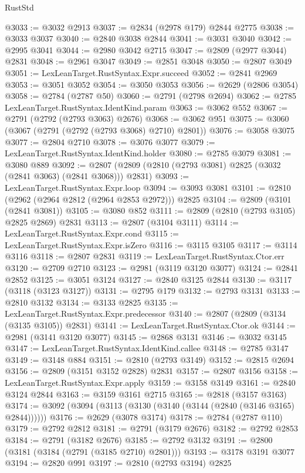 \begin{lexlean}{RustStd}
\begin{coremodule}
{\begin{coremodule}
{{{{{{{{{{{{{{{{{{{{{{{{{{{{{{{{{@3033 := @3032 @2913
@3037 := @2834 (@2978 @179) @2844 @2775
@3038 := @3033 @3037
@3040 := @2840 @3038 @2844
@3041 := @3031 @3040
@3042 := @2995 @3041
@3044 := @2980 @3042 @2715
@3047 := @2809 (@2977 @3044) @2831
@3048 := @2961 @3047
@3049 := @2851 @3048
@3050 := @2807 @3049
@3051 := LexLeanTarget.RustSyntax.Expr.succeed
@3052 := @2841 @2969
@3053 := @3051 @3052
@3054 := @3050 @3053
@3056 := @2629 (@2806 @3054)
@3058 := @2784 (@2787 @50)
@3060 := @2791 (@2798 @2694)
@3062 := @2785 LexLeanTarget.RustSyntax.IdentKind.param
@3063 := @3062 @552
@3067 := @2791 (@2792 (@2793 @3063) @2676)
@3068 := @3062 @951
@3075 := @3060 (@3067 (@2791 (@2792 (@2793 @3068) @2710) @2801))
@3076 := @3058 @3075
@3077 := @2804 @2710
@3078 := @3076 @3077
@3079 := LexLeanTarget.RustSyntax.IdentKind.holder
@3080 := @2785 @3079
@3081 := @3080 @889
@3092 := @2807 (@2809 (@2810 (@2793 @3081) @2825 (@3032 (@2841 @3063) (@2841 @3068))) @2831)
@3093 := LexLeanTarget.RustSyntax.Expr.loop
@3094 := @3093 @3081
@3101 := @2810 (@2962 (@2964 @2812 (@2964 @2853 @2972))) @2825
@3104 := @2809 (@3101 (@2841 @3081))
@3105 := @3080 @852
@3111 := @2809 (@2810 (@2793 @3105) @2825 @2869) @2831
@3113 := @2807 (@3104 @3111)
@3114 := LexLeanTarget.RustSyntax.Expr.cond
@3115 := LexLeanTarget.RustSyntax.Expr.isZero
@3116 := @3115 @3105
@3117 := @3114 @3116
@3118 := @2807 @2831
@3119 := LexLeanTarget.RustSyntax.Ctor.err
@3120 := @2709 @2710
@3123 := @2981 (@3119 @3120 @3077)
@3124 := @2841 @2852
@3125 := @3051 @3124
@3127 := @2840 @3125 @2844
@3130 := @3117 (@3118 (@3123 @3127))
@3131 := @2795 @179
@3132 := @2793 @3131
@3133 := @2810 @3132
@3134 := @3133 @2825
@3135 := LexLeanTarget.RustSyntax.Expr.predecessor
@3140 := @2807 (@2809 (@3134 (@3135 @3105)) @2831)
@3141 := LexLeanTarget.RustSyntax.Ctor.ok
@3144 := @2981 (@3141 @3120 @3077)
@3145 := @2868 @3131
@3146 := @3032 @3145
@3147 := LexLeanTarget.RustSyntax.IdentKind.callee
@3148 := @2785 @3147
@3149 := @3148 @884
@3151 := @2810 (@2793 @3149)
@3152 := @2815 @2694
@3156 := @2809 (@3151 @3152 @2828) @2831
@3157 := @2807 @3156
@3158 := LexLeanTarget.RustSyntax.Expr.apply
@3159 := @3158 @3149
@3161 := @2840 @3124 @2844
@3163 := @3159 @3161 @2715
@3165 := @2818 (@3157 @3163)
@3174 := @3092 (@3094 (@3113 (@3130 (@3140 (@3144 (@2840 (@3146 @3165) @2844))))))
@3176 := @2629 (@3078 @3174)
@3178 := @2784 (@2787 @110)
@3179 := @2792 @2812
@3181 := @2791 (@3179 @2676)
@3182 := @2792 @2853
@3184 := @2791 (@3182 @2676)
@3185 := @2792 @3132
@3191 := @2800 (@3181 (@3184 (@2791 (@3185 @2710) @2801)))
@3193 := @3178 @3191 @3077
@3194 := @2820 @991
@3197 := @2810 (@2793 @3194) @2825
}}}}}}}}}}}}}}}}}}}}}}}}}}}}}}}}}
\end{coremodule}}
\end{coremodule}
\end{lexlean}
